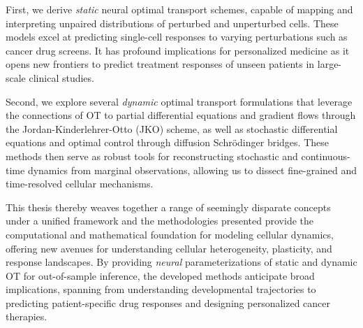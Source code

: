 First, we derive \emph{static} neural optimal transport schemes, capable of mapping and interpreting unpaired distributions of perturbed and unperturbed cells. These models excel at predicting single-cell responses to varying perturbations such as cancer drug screens. It has profound implications for personalized medicine as it opens new frontiers to predict treatment responses of unseen patients in large-scale clinical studies.

Second, we explore several \emph{dynamic} optimal transport formulations that leverage the connections of OT to partial differential equations and gradient flows through the Jordan-Kinderlehrer-Otto (JKO) scheme, as well as stochastic differential equations and optimal control through diffusion Schr{\"o}dinger bridges. These methods then serve as robust tools for reconstructing stochastic and continuous-time dynamics from marginal observations, allowing us to dissect fine-grained and time-resolved cellular mechanisms.

This thesis thereby weaves together a range of seemingly disparate concepts under a unified framework and the methodologies presented provide the computational and mathematical foundation for modeling cellular dynamics, offering new avenues for understanding cellular heterogeneity, plasticity, and response landscapes.
By providing \emph{neural} parameterizations of static and dynamic OT for out-of-sample inference, the developed methods anticipate broad implications, spanning from understanding developmental trajectories to predicting patient-specific drug responses and designing personalized cancer therapies.


\endgroup

\cleardoublepage%

\begingroup
\let\clearpage\relax
\let\cleardoublepage\relax
\let\cleardoublepage\relax

